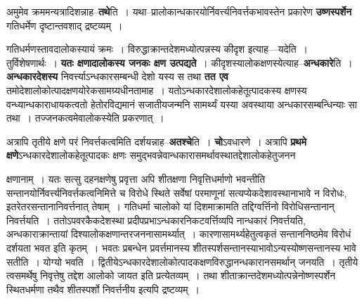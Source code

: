 \documentclass[article,12pt,a4paper]{memoir}
\begin{document}
	  \pstart अमुमेव क्रममन्यत्रादिशन्नाह--\textbf{तथे}ति । यथा--प्रालोकान्धकारयोर्निवर्त्त्यनिवर्त्तकभावस्तेन प्रकारेण \textbf{उष्णस्पर्शेन} गतिधर्मेण दृष्टान्तवशाद् द्रष्टव्यम् ।
	\pend
      

	  \pstart गतिधर्मणस्तावदालोकस्यायं क्रमः । विरुद्धाक्रान्तदेशमध्योत्पन्नस्य कीदृश इत्याह—यदेति । तुर्विशेषणार्थः । \textbf{यतः क्षणादालोकस्य जनकः क्षण उत्पद्यते} । कीदृशस्यालोकक्षणस्येत्याह--\textbf{अन्धकारे}ति । \textbf{अन्धकारदेशस्य} निवर्त्त्याऽन्धकारसम्बन्धी देशो यस्य स तथा \textbf{तत एव} तमोदेशालोकोत्पादक्षणयोरेकसामग्र्यधीनतामाह । यतोऽन्धकारदेशालोकहेतूत्पादकस्य क्षणस्य वन्ध्यान्धकाराधायकत्वतो हेतोरविद्यमानं सजातीयजन्मनि सामर्थ्यं यस्या अवस्थाया अन्धकारसम्बन्धिन्याः सा तथा । तज्जनकत्वमेवालोकस्येति प्रकरणात् ।
	\pend
      

	  \pstart अत्रापि तृतीये क्षणे परं निवर्त्तकत्वमिति दर्शयन्नाह--\textbf{अतश्चे}ति । \textbf{चो}ऽवधारणे । अत्रापि \textbf{प्रथमे क्षणे}ऽन्धकारदेशालोकहेतूत्पादकः क्षणः समुद्भवन्नेवान्धकारासमर्थावस्थातद्देशालोकहेतुजनन  \leavevmode{} 
	  
	क्षणानाम् । यतः सत्सु दहनक्षणेषु प्रवृत्ता अपि शीतक्षणा निवृत्तिधर्माणो भवन्तीति सन्तानयोर्निवर्त्त्यनिवर्त्तकत्वनिमित्ते च विरोधे स्थिते सर्वेषां परमाणूनां सत्यप्येकदेशावस्थानाभावे न विरोधः, इतरेतरसन्तानानिवर्त्तनात् तेषाम् । गतिधर्मा चालोको यां दिशमाक्रामति तद्दिग्वर्त्तिनो विरोधिसन्तानान् निवर्त्तयति । ततोऽपवरकैकदेशस्था प्रदीपप्रभाऽन्धकारनिकटवर्त्तिव्यपि नान्धकारं निवर्त्तयति, अन्धकाराक्रान्तायां दिश्यालोकक्षणान्तरजननासामर्थ्यात् । कारणासामर्थ्यहेतुत्वकृतं सन्ताननिष्ठमेव विरोधं दर्शयता भवत इति कृतम् । भवतः प्रबन्धेन प्रवर्त्तमानस्य शीतस्पर्शसन्तानस्याभावोऽन्यस्योष्णसन्तानस्य भावे सतीति । योग्यो भवति । द्वितीयेऽन्धकारदेशालोकोत्पादकक्षणविरुद्धानन्धकारानसमर्थान् जनयति । तृतीये त्वसमर्थेषु निवृत्तेषु तद्देश आलोको जायत इति प्रत्येतव्यम् । तथा शीताक्रान्तदेशमध्योत्पन्नेनोष्णस्पर्शेन स्थितधर्मणा तथैव शीतस्पर्शो निवर्त्तनीय इत्यपि द्रष्टव्यम् ।
	\pend
      
\end{document}
